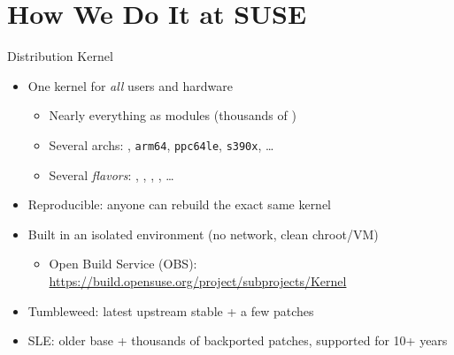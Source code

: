 
\section{How We Do It at SUSE}
\frame{\sectionpage}

\begin{frame}{Distribution Kernel}

  \begin{itemize}[<+->]
    \item One kernel for \emph{all} users and hardware
      \begin{itemize}
	\item Nearly everything as modules (thousands of )
	\item Several archs: \xesh, \texttt{arm64}, \texttt{ppc64le}, \texttt{s390x}, \dots
	\item Several \emph{flavors}: , , , , \dots
      \end{itemize}
    \item Reproducible: anyone can rebuild the exact same kernel
    \item Built in an isolated environment (no network, clean chroot/VM)
      \begin{itemize}[<.->]
	\item Open Build Service (OBS): \url{https://build.opensuse.org/project/subprojects/Kernel}
      \end{itemize}
    \item Tumbleweed: latest upstream stable + a few patches
    \item SLE: older base + thousands of backported patches, supported for 10+ years
  \end{itemize}

\end{frame}

